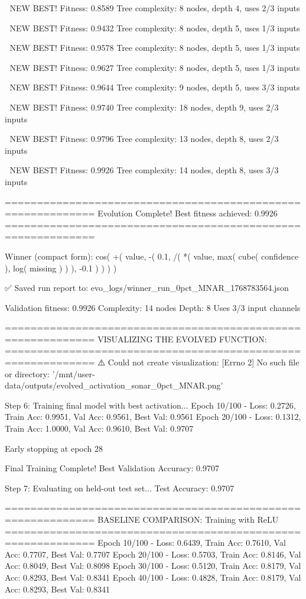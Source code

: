 🎯 NEW BEST! Fitness: 0.8589
Tree complexity: 8 nodes, depth 4, uses 2/3 inputs

🎯 NEW BEST! Fitness: 0.9432
Tree complexity: 8 nodes, depth 5, uses 1/3 inputs

🎯 NEW BEST! Fitness: 0.9578
Tree complexity: 8 nodes, depth 5, uses 1/3 inputs

🎯 NEW BEST! Fitness: 0.9627
Tree complexity: 8 nodes, depth 5, uses 1/3 inputs

🎯 NEW BEST! Fitness: 0.9644
Tree complexity: 9 nodes, depth 5, uses 3/3 inputs

🎯 NEW BEST! Fitness: 0.9740
Tree complexity: 18 nodes, depth 9, uses 2/3 inputs

🎯 NEW BEST! Fitness: 0.9796
Tree complexity: 13 nodes, depth 8, uses 2/3 inputs

🎯 NEW BEST! Fitness: 0.9926
Tree complexity: 14 nodes, depth 8, uses 3/3 inputs

============================================================
Evolution Complete!
Best fitness achieved: 0.9926
============================================================

Winner (compact form):
 cos(
  +(
    value,
    -(
      0.1,
      /(
        *(
          value,
          max(
            cube(
              confidence
            ),
            log(
              missing
            )
          )
        ),
        -0.1
      )
    )
  )
)

✅ Saved run report to: evo_logs/winner_run_0pct_MNAR_1768783564.json

Validation fitness: 0.9926
Complexity: 14 nodes
Depth: 8
Uses 3/3 input channels

============================================================
VISUALIZING THE EVOLVED FUNCTION:
============================================================
⚠️ Could not create visualization: [Errno 2] No such file or directory: '/mnt/user-data/outputs/evolved_activation_sonar_0pct_MNAR.png'

Step 6: Training final model with best activation...
Epoch  10/100 - Loss: 0.2726, Train Acc: 0.9951, Val Acc: 0.9561, Best Val: 0.9561
Epoch  20/100 - Loss: 0.1312, Train Acc: 1.0000, Val Acc: 0.9610, Best Val: 0.9707

Early stopping at epoch 28

Final Training Complete!
Best Validation Accuracy: 0.9707

Step 7: Evaluating on held-out test set...
Test Accuracy: 0.9707

============================================================
BASELINE COMPARISON: Training with ReLU
============================================================
Epoch  10/100 - Loss: 0.6439, Train Acc: 0.7610, Val Acc: 0.7707, Best Val: 0.7707
Epoch  20/100 - Loss: 0.5703, Train Acc: 0.8146, Val Acc: 0.8049, Best Val: 0.8098
Epoch  30/100 - Loss: 0.5120, Train Acc: 0.8179, Val Acc: 0.8293, Best Val: 0.8341
Epoch  40/100 - Loss: 0.4828, Train Acc: 0.8179, Val Acc: 0.8293, Best Val: 0.8341

